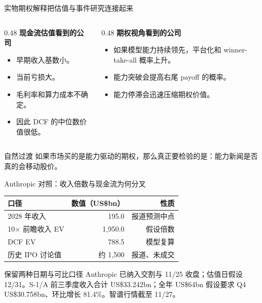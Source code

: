 \documentclass[aspectratio=169,11pt]{beamer}
\newcommand{\smallnote}[1]{\vspace{0.2em}{\footnotesize #1}}
\begin{document}
\begin{frame}{实物期权解释把估值与事件研究连接起来}
  \begin{columns}[T,onlytextwidth]
    \begin{column}{0.48\textwidth}
      \textbf{现金流估值看到的公司}
      \begin{itemize}
        \item 早期收入基数小。
        \item 当前亏损大。
        \item 毛利率和算力成本不确定。
        \item 因此 DCF 的中位数价值很低。
      \end{itemize}
    \end{column}
    \begin{column}{0.48\textwidth}
      \textbf{期权视角看到的公司}
      \begin{itemize}
        \item 如果模型能力持续领先，平台化和 winner-take-all 概率上升。
        \item 能力突破会提高右尾 payoff 的概率。
        \item 能力停滞会迅速压缩期权价值。
      \end{itemize}
    \end{column}
  \end{columns}
  \vspace{0.5em}
  \begin{block}{自然过渡}
    如果市场买的是能力驱动的期权，那么真正要检验的是：能力新闻是否真的会移动股价。
  \end{block}
\end{frame}

\begin{frame}{Anthropic 对照：收入倍数与现金流为何分叉}
  \begin{table}
  \centering\small
  \begin{tabular}{lrr}
  \toprule
  口径 & 数值（US\$bn） & 性质 \\
  \midrule
  2028 年收入 & 195.0 & 报道预测中点 \\
  10$\times$ 前瞻收入 EV & 1,950.0 & 假设倍数 \\
  DCF EV & 788.5 & 模型复算 \\
  历史 IPO 讨论值 & 约 1,500 & 报道、未成交 \\
  \bottomrule
  \end{tabular}
  \end{table}
  \begin{block}{保留两种日期与可比口径}
    Anthropic 已纳入交割与 11/25 收盘；估值日假设 12/31。S-1/A 前三季度收入合计 US\$33.242bn；全年 US\$64bn 假设要求 Q4 US\$30.758bn、环比增长 81.4\%。智谱行情截至 11/27。
  \end{block}
  \smallnote{来源：公开 S-1、Anthropic 模型及 Reuters；US\$1.5tn 仍为讨论值，非发行定价。}
\end{frame}
\end{document}
